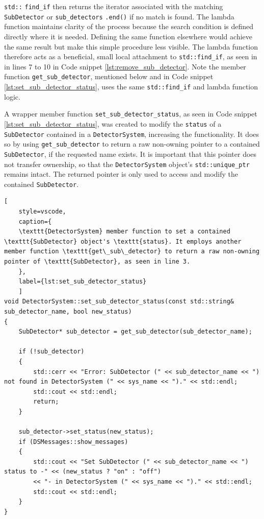 \documentclass{article}
\begin{document}
\texttt{std::} \texttt{find\_if} then returns the iterator associated with the matching \texttt{SubDetector} or \texttt{sub\_detectors} \texttt{.end()} if no match is found.  
The lambda function maintains clarity of the process because the search condition is defined directly where it is needed. Defining the same function elsewhere would achieve the same result but make this simple procedure less visible.
The lambda function therefore acts as a beneficial, small local attachment to \texttt{std::find\_if}, as seen in in lines 7 to 10 in Code snippet \ref{lst:remove_sub_detector}.
Note the member function \texttt{get\_sub\_detector}, mentioned below and in Code snippet \ref{lst:set_sub_detector_status}, uses the same \texttt{std::find\_if} and lambda function logic.

A wrapper member function \texttt{set\_sub\_detector\_status}, as seen in Code snippet \ref{lst:set_sub_detector_status}, was created to modify the \texttt{status} of a \texttt{SubDetector} contained in a \texttt{DetectorSystem}, increasing the functionality.
It does so by using \texttt{get\_sub\_detector} to return a raw non-owning pointer to a contained \texttt{SubDetector}, if the requested name exists.
It is important that this pointer does not transfer ownership, so that the \texttt{DetectorSystem} object's \texttt{std::unique\_ptr} remains intact.
The returned pointer is only used to access and modify the contained \texttt{SubDetector}.
\clearpage
\begin{lstlisting}[
    style=vscode, 
    caption={
    \texttt{DetectorSystem} member function to set a contained \texttt{SubDetector} object's \texttt{status}. It employs another member function \texttt{get\_sub\_detector} to return a raw non-owning pointer of \texttt{SubDetector}, as seen in line 3.
    },
    label={lst:set_sub_detector_status}
    ]
void DetectorSystem::set_sub_detector_status(const std::string& sub_detector_name, bool new_status)
{
    SubDetector* sub_detector = get_sub_detector(sub_detector_name);

    if (!sub_detector)
    {
        std::cerr << "Error: SubDetector (" << sub_detector_name << ") not found in DetectorSystem (" << sys_name << ")." << std::endl;    
        std::cout << std::endl;
        return;
    }
    
    sub_detector->set_status(new_status);
    if (DSMessages::show_messages)
    {
        std::cout << "Set SubDetector (" << sub_detector_name << ") status to -" << (new_status ? "on" : "off") 
        << "- in DetectorSystem (" << sys_name << ")." << std::endl;
        std::cout << std::endl;
    }
}
\end{lstlisting}
\end{document}
